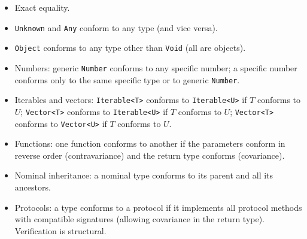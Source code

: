 \documentclass[12pt,a4paper]{report}
\begin{document}
\begin{itemize}
    \item Exact equality.
    \item \texttt{Unknown} and \texttt{Any} conform to any type (and vice versa).
    \item \texttt{Object} conforms to any type other than \texttt{Void} (all are objects).
    \item Numbers: generic \texttt{Number} conforms to any specific number; a specific number conforms only to the same specific type or to generic \texttt{Number}.
    \item Iterables and vectors: \texttt{Iterable<T>} conforms to \texttt{Iterable<U>} if $T$ conforms to $U$;
    \texttt{Vector<T>} conforms to \texttt{Iterable<U>} if $T$ conforms to $U$; \texttt{Vector<T>} conforms to \texttt{Vector<U>} if $T$ conforms to $U$.
    \item Functions: one function conforms to another if the parameters conform in reverse order (contravariance) and the return type conforms (covariance).
    \item Nominal inheritance: a nominal type conforms to its parent and all its ancestors.
    \item Protocols: a type conforms to a protocol if it implements all protocol methods with compatible signatures (allowing covariance in the return type).
    Verification is structural.
\end{itemize}
\end{document}
